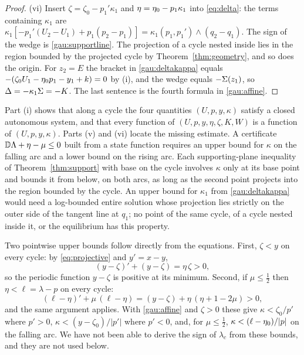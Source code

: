 \begin{proof}
(vi) Insert $\zeta=\zeta_0-p_1'\kappa_1$ and $\eta=\eta_0-p_1\kappa_1$ into \eqref{eq:delta}: the terms containing $\kappa_1$ are $\kappa_1[-p_1'(U_2-U_1)+p_1(p_2-p_1)]=\kappa_1(p_1,p_1')\wedge(q_2-q_1)$. The sign of the wedge is \eqref{gau:supportline}. The projection of a cycle nested inside lies in the region bounded by the projected cycle by Theorem~\ref{thm:geometry}, and so does the origin. For $z_2=E$ the bracket in \eqref{gau:deltakappa} equals $-(\zeta_0U_1-\eta_0 p_1-y_1+k)=0$ by (i), and the wedge equals $-\Sigma(z_1)$, so $\Delta=-\kappa_1\Sigma=-K$. The last sentence is the fourth formula in \eqref{gau:affine}.
\end{proof}

Part (i) shows that along a cycle the four quantities $(U,p,y,\kappa)$ satisfy a closed autonomous system, and that every function of $(U,p,y,\eta,\zeta,K,W)$ is a function of $(U,p,y,\kappa)$. Parts (v) and (vi) locate the missing estimate. A certificate $\mathbb D\Lambda+\eta-\mu\le0$ built from a state function requires an upper bound for $\kappa$ on the falling arc and a lower bound on the rising arc. Each supporting-plane inequality of Theorem~\ref{thm:support} with base on the cycle involves $\kappa$ only at its base point and bounds it from below, on both arcs, as long as the second point projects into the region bounded by the cycle. An upper bound for $\kappa_1$ from \eqref{gau:deltakappa} would need a log-bounded entire solution whose projection lies strictly on the outer side of the tangent line at $q_1$; no point of the same cycle, of a cycle nested inside it, or the equilibrium has this property.

\begin{remark}\label{gau:dynamicbounds}
Two pointwise upper bounds follow directly from the equations. First, $\zeta<y$ on every cycle: by \eqref{eq:projective} and $y'=x-y$,
\[
(y-\zeta)'+(y-\zeta)=\eta\,\zeta>0,
\]
so the periodic function $y-\zeta$ is positive at its minimum. Second, if $\mu\le\tfrac12$ then $\eta<\ell=\lambda-p$ on every cycle:
\[
(\ell-\eta)'+\mu\,(\ell-\eta)=(y-\zeta)+\eta\,(\eta+1-2\mu)>0 ,
\]
and the same argument applies. With \eqref{gau:affine} and $\zeta>0$ these give $\kappa<\zeta_0/p'$ where $p'>0$, $\kappa<(y-\zeta_0)/|p'|$ where $p'<0$, and, for $\mu\le\tfrac12$, $\kappa<(\ell-\eta_0)/|p|$ on the falling arc. We have not been able to derive the sign of $\lambda_c$ from these bounds, and they are not used below.
\end{remark}

